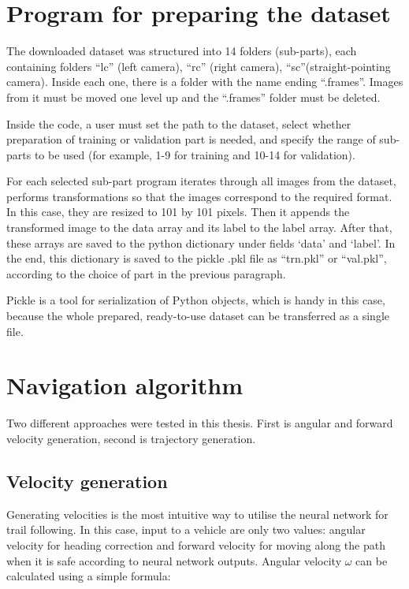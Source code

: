 \section{Program for preparing the dataset}

The downloaded dataset was structured into 14 folders (sub-parts), each containing folders “lc” (left camera), “rc” (right camera), “sc”(straight-pointing camera). Inside each one, there is a folder with the name ending “.frames”. Images from it must be moved one level up and the “.frames” folder must be deleted. 

Inside the code, a user must set the path to the dataset, select whether preparation of training or validation part is needed, and specify the range of sub-parts to be used (for example, 1-9 for training and 10-14 for validation).

For each selected sub-part program iterates through all images from the dataset, performs transformations so that the images correspond to the required format. In this case, they are resized to 101 by 101 pixels. Then it appends the transformed image to the data array and its label to the label array. After that, these arrays are saved to the python dictionary under fields ‘data’ and ‘label’. In the end, this dictionary is saved to the pickle .pkl file as “trn.pkl” or “val.pkl”, according to the choice of part in the previous paragraph.

Pickle is a tool for serialization of Python objects, which is handy in this case, because the whole prepared, ready-to-use dataset can be transferred as a single file.

\section{Navigation algorithm}

Two different approaches were tested in this thesis. First is angular and forward velocity generation, second is trajectory generation. 

\subsection{Velocity generation}

Generating velocities is the most intuitive way to utilise the neural network for trail following. In this case, input to a vehicle are only two values: angular velocity for heading correction and forward velocity for moving along the path when it is safe according to neural network outputs. Angular velocity $\omega$ can be calculated using a simple formula:

